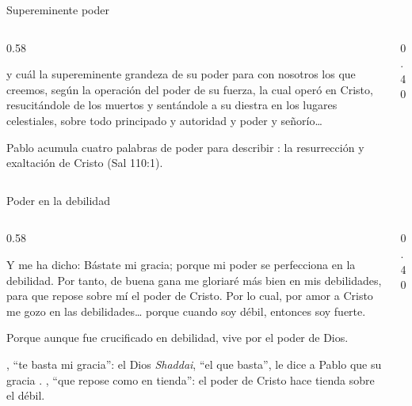 \begin{frame}{Supereminente poder}
\begin{columns}[c,onlytextwidth]
\begin{column}{0.58\textwidth}
\begin{cita}[fontupper=\scriptsize\itshape]y cuál la supereminente grandeza de su poder para con nosotros los que creemos, según la operación del poder de su fuerza, la cual operó en Cristo, resucitándole de los muertos y sentándole a su diestra en los lugares celestiales, sobre todo principado y autoridad y poder y señorío\ldots{}\end{cita}
\centering
{}\par\smallskip
\scriptsize Pablo acumula cuatro palabras de poder para describir : la resurrección y exaltación de Cristo (Sal 110:1).
\end{column}
\begin{column}{0.40\textwidth}\end{column}
\end{columns}
\end{frame}

\begin{frame}{Poder en la debilidad}
\begin{columns}[c,onlytextwidth]
\begin{column}{0.58\textwidth}
\begin{cita}[fontupper=\scriptsize\itshape]Y me ha dicho: Bástate mi gracia; porque mi poder se perfecciona en la debilidad. Por tanto, de buena gana me gloriaré más bien en mis debilidades, para que repose sobre mí el poder de Cristo. Por lo cual, por amor a Cristo me gozo en las debilidades\ldots{} porque cuando soy débil, entonces soy fuerte.\end{cita}
\begin{cita}[fontupper=\scriptsize\itshape]Porque aunque fue crucificado en debilidad, vive por el poder de Dios.\end{cita}
\scriptsize {}, ``te basta mi gracia'': el Dios \emph{Shaddai}, ``el que basta'', le dice a Pablo que su gracia . , ``que repose como en tienda'': el poder de Cristo hace tienda sobre el débil.
\end{column}
\begin{column}{0.40\textwidth}\end{column}
\end{columns}
\end{frame}

